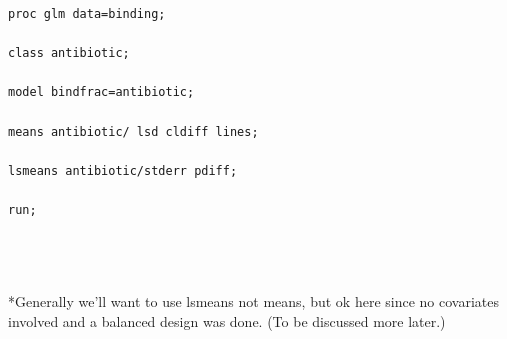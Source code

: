 \begin{small}
\begin{verbatim}
proc glm data=binding;

class antibiotic;

model bindfrac=antibiotic;

means antibiotic/ lsd cldiff lines;

lsmeans antibiotic/stderr pdiff;

run;
\end{verbatim}
\end{small}
~\\~\\~\\
*Generally we'll want to use lsmeans not means, but ok here since no covariates involved and a balanced design was done. (To be discussed more later.)
\begin{center}

\end{center}
